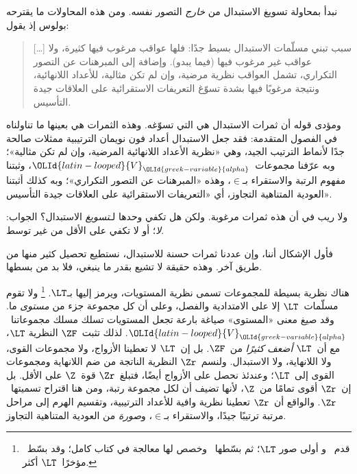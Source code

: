\documentclass[../../../include/open-logic-section]{subfiles}
\begin{document}

نبدأ بمحاولة تسويغ الاستبدال من \emph{خارج} التصور نفسه. ومن هذه
المحاولات ما يقترحه بولوس إذ يقول:
\begin{quote}
  [\ldots] سبب تبني مسلّمات الاستبدال بسيط جدًا: فلها عواقب مرغوب
  فيها كثيرة، ولا عواقب غير مرغوب فيها (فيما يبدو). وإضافة إلى
  المبرهنات عن التصور التكراري، تشمل العواقب نظرية مرضية، وإن لم تكن
  مثالية، للأعداد اللانهائية، ونتيجة مرغوبًا فيها بشدة تسوّغ التعريفات
  الاستقرائية على العلاقات جيدة التأسيس.
  \citep[229]{Boolos1971}
\end{quote}
ومؤدى قوله أن ثمرات الاستبدال هي التي تسوّغه. وهذه الثمرات هي بعينها
ما تناولناه في الفصول المتقدمة: فقد جعل الاستبدال أعداد فون نويمان
الترتيبية ممثلات صالحة جدًا لأنماط الترتيب الجيد، وهي «نظرية الأعداد
اللانهائية المرضية، وإن لم تكن مثالية»؛ وبه عرّفنا مجموعات~${\OLId{latin-looped}{V}}_{\OLId{greek-variable}{alpha}}$،
وثبتنا مفهوم الرتبة والاستقراء بـ$\in$، وهذه «المبرهنات عن التصور
التكراري»؛ وبه كذلك أثبتنا العودية المتناهية التجاوز، أي «التعريفات
الاستقرائية على العلاقات جيدة التأسيس».

ولا ريب في أن هذه ثمرات مرغوبة. ولكن هل تكفي وحدها
لـ\emph{تسويغ} الاستبدال؟ الجواب: \emph{لا}؛ أو لا تكفي على
الأقل من غير توسط.

فأول الإشكال أننا، وإن عددنا ثمرات حسنة للاستبدال، نستطيع تحصيل
كثير منها من طريق آخر. وهذه حقيقة لا تشيع بقدر ما ينبغي، فلا بد من
بسطها.

هناك نظرية بسيطة للمجموعات تسمى نظرية المستويات، ويرمز إليها بـ$\LT$.
\footnote{قدم~\citet{Montague1965} و\citet{Scott1974} أولى صور
  $\LT$؛ ثم بسّطها~\citet{Potter2004} وخصص لها معالجة في كتاب كامل؛
  وقد بسّط~\citet{ButtonLT1} مؤخرًا~$\LT$ أكثر.}
ولا تقوم مسلّمات~$\LT$ إلا على الامتدادية والفصل، وعلى أن كل مجموعة
جزء من \emph{مستوى} ما. وقد صيغ معنى «المستوى» صياغة بارعة تجعل
المستويات تسلك مسلك مجموعاتنا~${\OLId{latin-looped}{V}}_{\OLId{greek-variable}{alpha}}$. لذلك تثبت~$\ZF$ النظرية
$\LT$، مع أن~$\LT$ \emph{أضعف كثيرًا} من~$\ZF$. بل إن~$\LT$ لا
تعطينا الأزواج، ولا مجموعات القوى، ولا اللانهاية، ولا الاستبدال.
ولنسم~$\Zr$ النظرية الناتجة من ضم اللانهاية ومجموعات القوى إلى~$\LT$؛
وعندئذ نحصل على الأزواج أيضًا، فتبلغ~$\Zr$ قوة~$\Z$ على الأقل. بل
إن~$\Zr$ أقوى تمامًا من~$\Z$، لأنها تضيف أن لكل مجموعة رتبة، ومن هنا
اقتراح تسميتها~$\Zr$. والواقع أن~$\Zr$ تعطينا نظرية وافية للأعداد
الترتيبية، وتقسيم الهرم إلى مراحل مرتبة ترتيبًا جيدًا، والاستقراء
بـ$\in$، و\emph{صورة} من العودية المتناهية التجاوز.
\end{document}
